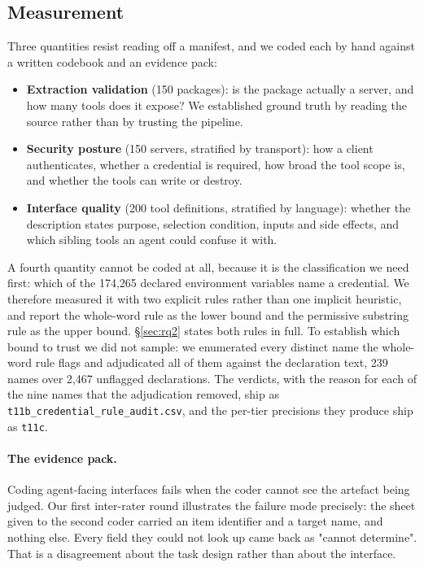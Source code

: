 \documentclass[a4paper,fleqn]{cas-dc}
\begin{document}
\subsection{Measurement}\label{sec:coding}

Three quantities resist reading off a manifest, and we coded each by hand
against a written codebook and an evidence pack:

\begin{itemize}
\item \textbf{Extraction validation} (150 packages): is the package actually a
server, and how many tools does it expose? We established ground truth by
reading the source rather than by trusting the pipeline.
\item \textbf{Security posture} (150 servers, stratified by transport): how a
client authenticates, whether a credential is required, how broad the tool
scope is, and whether the tools can write or destroy.
\item \textbf{Interface quality} (200 tool definitions, stratified by language):
whether the description states purpose, selection condition, inputs and side
effects, and which sibling tools an agent could confuse it with.
\end{itemize}

A fourth quantity cannot be coded at all, because it is the classification we
need first: which of the 174,265 declared environment variables name a
credential. We therefore measured it with two explicit rules rather than one
implicit heuristic, and report the whole-word rule as the lower bound and the
permissive substring rule as the upper bound. \S\ref{sec:rq2} states both rules
in full. To establish which bound to trust we did not sample: we enumerated
every distinct name the whole-word rule flags and adjudicated all of them
against the declaration text, 239 names over 2,467 unflagged declarations.
The verdicts, with the reason for each of the nine names that the adjudication
removed, ship as \texttt{t11b\_credential\_rule\_audit.csv}, and the per-tier
precisions they produce ship as \texttt{t11c}.

\paragraph{The evidence pack.} Coding agent-facing interfaces fails when the
coder cannot see the artefact being judged. Our first inter-rater round
illustrates the failure mode precisely: the sheet given to the second coder
carried an item identifier and a target name, and nothing else. Every field
they could not look up came back as "cannot determine". That is a disagreement
about the task design rather than about the interface.
\end{document}
